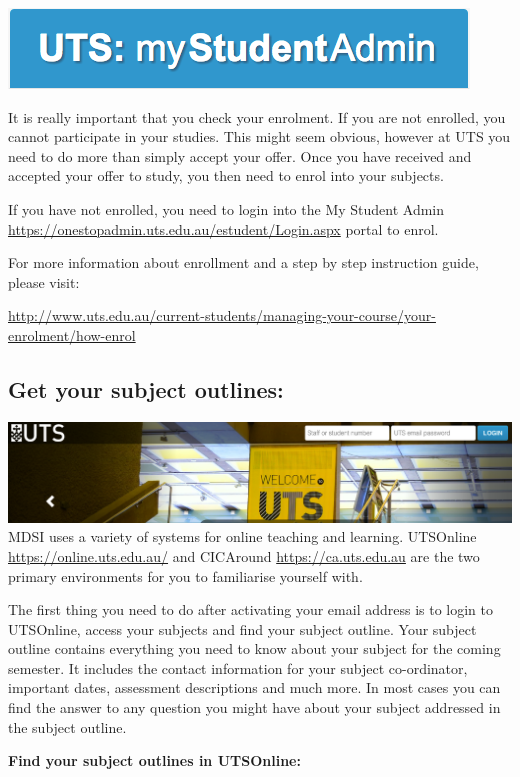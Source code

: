\documentclass[]{book}
\theoremstyle{definition}
\theoremstyle{definition}
\theoremstyle{remark}
\begin{document}
\includegraphics{Images/StudentAdmin.png}

It is really important that you check your enrolment. If you are not
enrolled, you cannot participate in your studies. This might seem
obvious, however at UTS you need to do more than simply accept your
offer. Once you have received and accepted your offer to study, you then
need to enrol into your subjects.

If you have not enrolled, you need to login into the My Student Admin
\url{https://onestopadmin.uts.edu.au/estudent/Login.aspx} portal to
enrol.

For more information about enrollment and a step by step instruction
guide, please visit:

\url{http://www.uts.edu.au/current-students/managing-your-course/your-enrolment/how-enrol}

\subsection{Get your subject outlines:}\label{get-your-subject-outlines}

\includegraphics{images/UTSOnline.png} MDSI uses a variety of systems
for online teaching and learning. UTSOnline
\url{https://online.uts.edu.au/} and CICAround
\url{https://ca.uts.edu.au} are the two primary environments for you to
familiarise yourself with.

The first thing you need to do after activating your email address is to
login to UTSOnline, access your subjects and find your subject outline.
Your subject outline contains everything you need to know about your
subject for the coming semester. It includes the contact information for
your subject co-ordinator, important dates, assessment descriptions and
much more. In most cases you can find the answer to any question you
might have about your subject addressed in the subject outline.

\textbf{Find your subject outlines in UTSOnline:}
\end{document}
